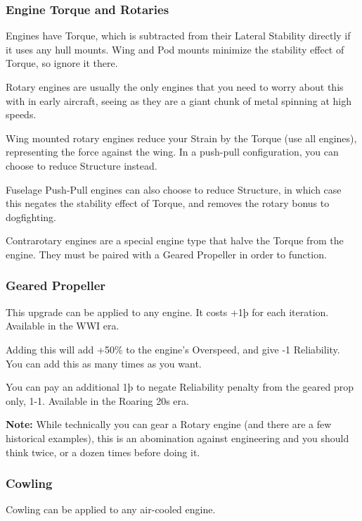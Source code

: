 \documentclass{article}
\begin{document}
\subsubsection{Engine Torque and Rotaries}
\label{_Engine Torque and Rotaries}

Engines have Torque, which is subtracted from their Lateral Stability
directly if it uses any hull mounts. Wing and Pod mounts minimize the
stability effect of Torque, so ignore it there.

Rotary engines are usually the only engines that you need to worry about
this with in early aircraft, seeing as they are a giant chunk of metal
spinning at high speeds.

Wing mounted rotary engines reduce your Strain by the Torque (use all
engines), representing the force against the wing. In a push-pull
configuration, you can choose to reduce Structure instead.

Fuselage Push-Pull engines can also choose to reduce Structure, in which
case this negates the stability effect of Torque, and removes the rotary
bonus to dogfighting.

Contrarotary engines are a special engine type that halve the Torque
from the engine. They must be paired with a Geared Propeller in order to
function.

\subsubsection{Geared Propeller}
\label{_Geared Propeller}

This upgrade can be applied to any engine. It costs +1þ for each
iteration. Available in the WWI era.

Adding this will add +50\% to the engine's Overspeed, and give -1
Reliability. You can add this as many times as you want.

You can pay an additional 1þ to negate Reliability penalty from the
geared prop only, 1-1. Available in the Roaring 20s era.

\textbf{Note:} While technically you can gear a Rotary engine (and
there are a few historical examples), this is an abomination against
engineering and you should think twice, or a dozen times before doing it.

\subsubsection{Cowling}
\label{_Cowling}

Cowling can be applied to any air-cooled engine.
\end{document}
